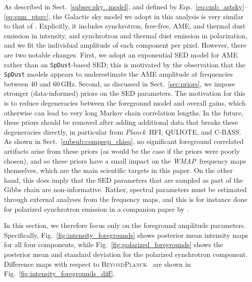 \documentclass[twocolumn]{../../common/aa}
\def\WMAP{\emph{WMAP}}
\def\Planck{\emph{Planck}}
\newcommand{\BP}{\textsc{BeyondPlanck}}
\begin{document}
As described in Sect.~\ref{subsec:sky_model}, and defined by Eqs.~\eqref{eq:cmb_astsky}--\eqref{eq:sum_ptsrc}, the Galactic sky model we adopt in this analysis is very similar to that of \citet{bp01}. Explicitly, it includes synchrotron, free-free, AME, and thermal dust emission in intensity, and synchrotron and thermal dust emission in polarization, and we fit the individual amplitude of each component per pixel. However, there are two notable changes. First, we adopt an exponential SED model for AME rather than an \texttt{SpDust}-based SED; this is motivated by the observation that the \texttt{SpDust} models appears to underestimate the AME amplitude at frequencies between 40 and 60\,GHz. Second, as discussed in Sect.~\ref{sec:priors}, we impose stronger (data-informed) priors on the SED parameters. The motivation for this is to reduce degeneracies between the foreground model and overall gains, which otherwise can lead to very long Markov chain correlation lengths. In the future, these priors should be removed after adding additional data that breaks these degeneracies directly, in particular from \Planck\ HFI, QUIJOTE, and C-BASS. As shown in Sect.~\ref{subsub:compsep_chisq}, no significant foreground correlated artifacts arise from these priors (as would be the case if the priors were poorly chosen), and so these priors have a small impact on the \WMAP\ frequency maps themselves, which are the main scientific targets in this paper. On the other hand, this does imply that the SED parameters that are sampled as part of the Gibbs chain are non-informative. Rather, spectral parameters must be estimated through external analyses from the frequency maps, and this is for instance done for polarized synchrotron emission in a companion paper by \citet{fuskeland:2023}.

In this section, we therefore focus only on the foreground amplitude parameters. Specifically, Fig.~\ref{fig:intensity_foregrounds} shows posterior mean intensity maps for all four components, while Fig.~\ref{fig:polarized_foregrounds} shows the posterior mean and standard deviation for the polarized synchrotron component. Difference maps with respect to \BP\ \citep{bp13,bp14} are shown in Fig.~\ref{fig:intensity_foregrounds_diff}.

\end{document}
